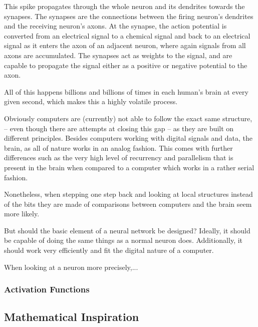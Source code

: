 This spike propagates through the whole neuron and its dendrites towards the synapses. The synapses are the connections between the firing neuron's dendrites and the  receiving neuron's axons.
At the synapse, the action potential is converted from an electrical signal to a chemical signal and back to an electrical signal as it enters the axon of an adjacent neuron, where again signals from all axons are accumulated.
The synapses act as weights to the signal, and are capable to propagate the signal either as a positive or negative potential to the axon.

All of this happens billions and billions of times in each human's brain at every given second, which makes this a highly volatile process.

Obviously computers are (currently) not able to follow the exact same structure, -- even though there are attempts at closing this gap \cite{brainscales} -- as they are built on different principles.
Besides computers working with digital signals and data, the brain, as all of nature works in an analog fashion.
This comes with further differences such as the very high level of recurrency and  parallelism that is present in the brain when compared to a computer which works in a rather serial fashion.

Nonetheless, when stepping one step back and looking at local structures instead of the bits they are made of comparisons between computers and the brain seem more likely.

But should the basic element of a neural network be designed?
Ideally, it should be capable of doing the same things as a normal neuron does.
Additionally, it should work very efficiently and fit the digital nature of a computer.

When looking at a neuron more precisely,...



\subsubsection{Activation Functions}

\subsection{Mathematical Inspiration}

